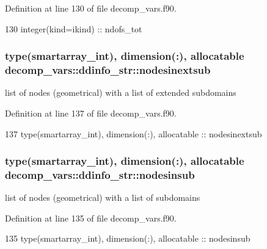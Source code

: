 Definition at line 130 of file decomp\+\_\+vars.\+f90.


\begin{DoxyCode}
130     \textcolor{keywordtype}{integer(kind=ikind)} :: ndofs\_tot
\end{DoxyCode}
\subsubsection[{nodesinextsub}]{\setlength{\rightskip}{0pt plus 5cm}type({\bf smartarray\+\_\+int}), dimension(\+:), allocatable decomp\+\_\+vars\+::ddinfo\+\_\+str\+::nodesinextsub\hspace{0.3cm}{\ttfamily [private]}}\label{structdecomp__vars_1_1ddinfo__str_ab4b9e284c046719a7e0429a3b89703f3}


list of nodes (geometrical) with a list of extended subdomains 



Definition at line 137 of file decomp\+\_\+vars.\+f90.


\begin{DoxyCode}
137     \textcolor{keywordtype}{type}(smartarray_int), \textcolor{keywordtype}{dimension(:)}, \textcolor{keywordtype}{allocatable} :: nodesinextsub
\end{DoxyCode}
\subsubsection[{nodesinsub}]{\setlength{\rightskip}{0pt plus 5cm}type({\bf smartarray\+\_\+int}), dimension(\+:), allocatable decomp\+\_\+vars\+::ddinfo\+\_\+str\+::nodesinsub\hspace{0.3cm}{\ttfamily [private]}}\label{structdecomp__vars_1_1ddinfo__str_a0dd279324bd51bf0b0db63515be165a9}


list of nodes (geometrical) with a list of subdomains 



Definition at line 135 of file decomp\+\_\+vars.\+f90.


\begin{DoxyCode}
135     \textcolor{keywordtype}{type}(smartarray_int), \textcolor{keywordtype}{dimension(:)}, \textcolor{keywordtype}{allocatable} :: nodesinsub
\end{DoxyCode}

